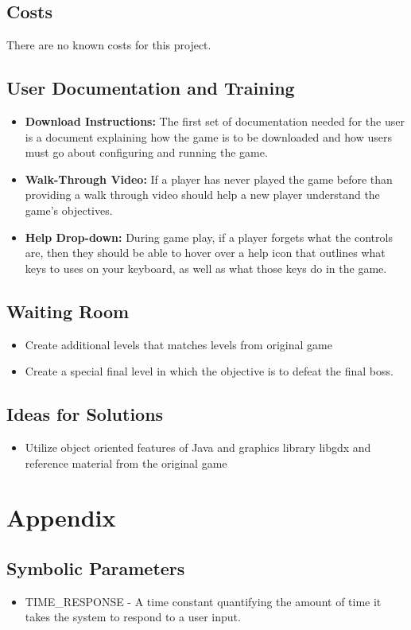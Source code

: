 \documentclass[12pt, titlepage]{article}
\begin{document}
\subsection{Costs}

There are no known costs for this project.

\subsection{User Documentation and Training}
\begin{itemize}
    \item \textbf{Download Instructions:} The first set of documentation needed for the user is a document explaining how the game is to be downloaded and how users must go about configuring and running the game.
    \item \textbf{Walk-Through Video:} If a player has never played the game before than providing a walk through video should help a new player understand the game's objectives.
    \item \textbf{Help Drop-down:} During game play, if a player forgets what the controls are, then they should be able to hover over a help icon that outlines what keys to uses on your keyboard, as well as what those keys do in the game.

\end{itemize}
\subsection{Waiting Room}
\begin{itemize}
    \item Create additional levels that matches levels from original game
    \item Create a special final level in which the objective is to defeat the final boss.
\end{itemize}

\subsection{Ideas for Solutions}
\begin{itemize}
    \item Utilize object oriented features of Java and graphics library libgdx and reference material from the original game
\end{itemize}





\newpage

\section{Appendix}

\subsection{Symbolic Parameters}

\begin{itemize}
    \item TIME\_RESPONSE - A time constant quantifying the amount of time it takes the system to respond to a user input.
\end{itemize}
\end{document}

